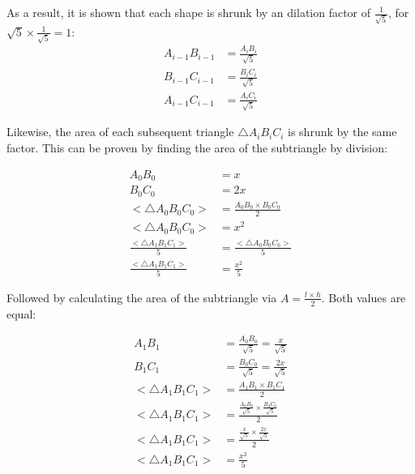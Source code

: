 \newpage
\noindent
As a result, it is shown that each shape is shrunk by an dilation factor of $\frac{1}{\sqrt{5}}$, for $\sqrt{5} \times \frac{1}{\sqrt{5}} = 1$:
\begin{equation}
    \begin{aligned}
        A_{i-1}B_{i-1} &= \frac{A_{i}B_{i}}{\sqrt{5}} \\
        B_{i-1}C_{i-1} &= \frac{B_{i}C_{i}}{\sqrt{5}} \\
        A_{i-1}C_{i-1} &= \frac{A_{i}C_{i}}{\sqrt{5}}
    \end{aligned}
\end{equation}

\noindent
Likewise, the area of each subsequent triangle $\triangle A_{i}B_{i}C_{i}$ is shrunk by the same factor. This can be proven by finding the area of the subtriangle by division:

\begin{equation}
    \begin{aligned}
        A_{0}B_{0} &= x \\
        B_{0}C_{0} &= 2x \\
        \big<\triangle A_{0}B_{0}C_{0}\big> &= \frac{A_{0}B_{0} \times B_{0}C_{0}}{2} \\
        \big<\triangle A_{0}B_{0}C_{0}\big> &= x^2 \\
        \frac{\big<\triangle A_{1}B_{1}C_{1}\big>}{5} &= \frac{\big<\triangle A_{0}B_{0}C_{0}\big>}{5} \\
        \frac{\big<\triangle A_{1}B_{1}C_{1}\big>}{5} &= \frac{x^2}{5}
    \end{aligned}
\end{equation}

\newpage
\noindent
Followed by calculating the area of the subtriangle via $A = \frac{l\times h}{2}$. Both values are equal:

\begin{equation}
    \begin{aligned}
        A_{1}B_{1} &= \frac{A_{0}B_{0}}{\sqrt{5}} = \frac{x}{\sqrt{5}}\\
        B_{1}C_{1} &= \frac{B_{0}C_{0}}{\sqrt{5}} = \frac{2x}{\sqrt{5}}\\
        \big<\triangle A_{1}B_{1}C_{1}\big> &= \frac{A_{1}B_{1} \times B_{1}C_{1}}{2} \\
        \big<\triangle A_{1}B_{1}C_{1}\big> &=  \frac{\frac{A_{0}B_{0}}{\sqrt{5}} \times \frac{B_{0}C_{0}}{\sqrt{5}}}{2} \\
        \big<\triangle A_{1}B_{1}C_{1}\big> &=  \frac{\frac{x}{\sqrt{5}} \times \frac{2x}{\sqrt{5}}}{2} \\
        \big<\triangle A_{1}B_{1}C_{1}\big> &=  \frac{x^2}{5}
    \end{aligned}
\end{equation}

